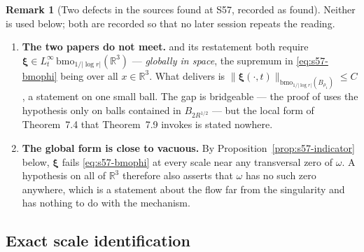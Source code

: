 \documentclass[11pt]{article}
\theoremstyle{definition}
\newtheorem{remark}[theorem]{Remark}
\theoremstyle{remark}
\newcommand{\R}{\mathbb{R}}
\begin{document}
\begin{remark}[Two defects in the sources found at S57, recorded as found]
  \label{rem:s57-defects}
  Neither is used below; both are recorded so that no later session repeats
  the reading.
  \begin{enumerate}[label=\textup{(\roman*)},leftmargin=2.6em]
  \item \textbf{The two papers do not meet.} \cite[Thm.~7.4]{Grujic2026Log}
    and its restatement \cite[Thm.~7.1]{Grujic2026Decay} both require
    $\boldsymbol\xi\in L^\infty_t\,\mathrm{bmo}_{1/|\log r|}(\R^3)$ ---
    \emph{globally in space}, the supremum in \eqref{eq:s57-bmophi} being over
    all $x\in\R^3$. What \cite[Cor.~5.8, Thm.~7.9]{Grujic2026Decay} delivers
    is $\|\boldsymbol\xi(\cdot,t)\|_{\mathrm{bmo}_{1/|\log r|}(B_{\rho_1})}
    \leq C$, a statement on one small ball. The gap is bridgeable --- the
    proof of \cite[Thm.~4.1]{Grujic2026Log} uses the hypothesis only on balls
    contained in $B_{2R^{1/2}}$ --- but the local form of Theorem~7.4 that
    Theorem~7.9 invokes is stated nowhere.
  \item \textbf{The global form is close to vacuous.} By
    Proposition~\ref{prop:s57-indicator} below, $\boldsymbol\xi$ fails
    \eqref{eq:s57-bmophi} at every scale near any transversal zero of
    $\omega$. A hypothesis on all of $\R^3$ therefore also asserts that
    $\omega$ has no such zero anywhere, which is a statement about the flow
    far from the singularity and has nothing to do with the mechanism.
  \end{enumerate}
\end{remark}

\subsection{Exact scale identification}
\label{subsec:s57-scale}
\end{document}
